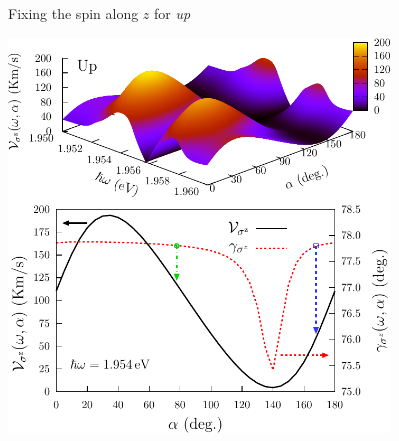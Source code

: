\documentclass{beamer}
\begin{document}
\begin{frame}
\begin{columns}
\begin{center}
\begin{figure}[h!]
\begin{tikzpicture}
\end{tikzpicture}
\end{figure}


\end{center}


\begin{center}

Fixing the spin along $z$ for \emph{up}

\vspace{2mm}

\includegraphics[width=0.95\textwidth]{figs/fig5.pdf}

\end{center}  


\end{columns}

\end{frame}

\end{document}
